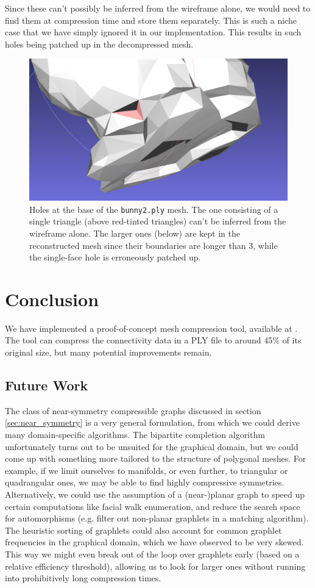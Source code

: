 \documentclass{egpubl}
\begin{document}
Since these can't possibly be inferred from the wireframe alone, we would need to find them at compression time and store them separately.
This is such a niche case that we have simply ignored it in our implementation. This results in such holes being patched up in the decompressed mesh.
\begin{figure}
\centering
\includegraphics[width=.8\linewidth]{figures/bunny2_holes.png}
\caption{Holes at the base of the \texttt{bunny2.ply} mesh. The one consisting of a single triangle (above red-tinted triangles) can't be inferred from the wireframe alone. The larger ones (below) are kept in the reconstructed mesh since their boundaries are longer than 3, while the single-face hole is erroneously patched up.}
\label{fig:bunny_holes}
\end{figure}

\section{Conclusion}

We have implemented a proof-of-concept mesh compression tool,
available at .
The tool can compress the connectivity data in a PLY file to around 45\% of its original size, but many potential improvements remain.

\subsection{Future Work}

The class of near-symmetry compressible graphs discussed in section \ref{sec:near_symmetry} is a very general formulation, from which we could derive many domain-specific algorithms. The bipartite completion algorithm unfortunately turns out to be unsuited for the graphical domain, but we could come up with something more tailored to the structure of polygonal meshes. For example, if we limit ourselves to manifolds, or even further, to triangular or quadrangular ones, we may be able to find highly compressive symmetries.
Alternatively, we could use the assumption of a (near-)planar graph to speed up certain computations like facial walk enumeration, %
and reduce the search space for automorphisms (e.g. filter out non-planar graphlets in a matching algorithm).
The heuristic sorting of graphlets could also account for common graphlet frequencies in the graphical domain, which we have observed to be very skewed. This way we might even break out of the loop over graphlets early (based on a relative efficiency threshold), allowing us to look for larger ones without running into prohibitively long compression times.
\end{document}
